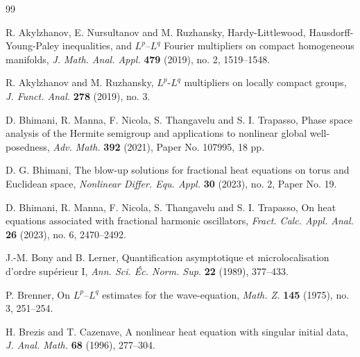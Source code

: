 \documentclass[12pt, reqno]{amsart}
\theoremstyle{definition}
\theoremstyle{remark}
\numberwithin{equation}{section}
\begin{document}

\begin{thebibliography}{99}




R. Akylzhanov, E. Nursultanov and M. Ruzhansky,
Hardy-Littlewood, Hausdorff-Young-Paley inequalities, and $L^p$--$L^q$ Fourier multipliers on compact homogeneous manifolds,
\emph{J. Math. Anal. Appl.} \textbf{479} (2019), no. 2, 1519--1548.

R. Akylzhanov and M. Ruzhansky,
$L^p$-$L^q$ multipliers on locally compact groups,
\emph{J. Funct. Anal.} \textbf{278} (2019), no. 3.



D. Bhimani, R. Manna, F. Nicola, S. Thangavelu and S. I. Trapasso,
Phase space analysis of the Hermite semigroup and applications to nonlinear global well-posedness,
\emph{Adv. Math.} \textbf{392} (2021), Paper No. 107995, 18 pp.

D. G. Bhimani,
The blow-up solutions for fractional heat equations on torus and Euclidean space,
\emph{Nonlinear Differ. Equ. Appl.} \textbf{30} (2023), no. 2, Paper No. 19.

D. Bhimani, R. Manna, F. Nicola, S. Thangavelu and S. I. Trapasso,
On heat equations associated with fractional harmonic oscillators,
\emph{Fract. Calc. Appl. Anal.} \textbf{26} (2023), no. 6, 2470--2492.

J.-M. Bony and B. Lerner,
Quantification asymptotique et microlocalisation d'ordre sup\'erieur I,
\emph{Ann. Sci. \'Ec. Norm. Sup.} \textbf{22} (1989), 377--433.

P. Brenner,
On $L^p$--$L^q$ estimates for the wave-equation,
\emph{Math. Z.} \textbf{145} (1975), no. 3, 251--254.

H. Brezis and T. Cazenave,
A nonlinear heat equation with singular initial data,
\emph{J. Anal. Math.} \textbf{68} (1996), 277--304.


\end{thebibliography}
\end{document}
